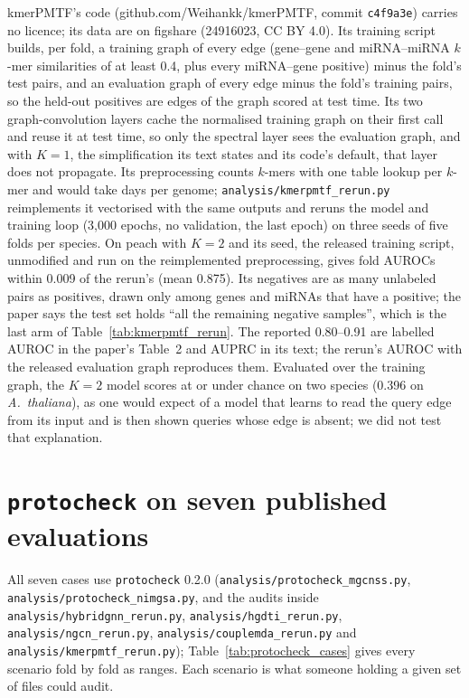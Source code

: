 \documentclass[review]{elsarticle}
\begin{document}
kmerPMTF's code (github.com/Weihankk/kmerPMTF, commit \texttt{c4f9a3e}) carries no licence; its data are on figshare
(24916023, CC BY 4.0). Its training script builds, per fold, a training graph of every edge (gene--gene and
miRNA--miRNA $k$-mer similarities of at least 0.4, plus every miRNA--gene positive) minus the fold's test pairs,
and an evaluation graph of every edge minus the fold's training pairs, so the held-out positives are edges of
the graph scored at test time. Its two graph-convolution layers cache the normalised training graph on their
first call and reuse it at test time, so only the spectral layer sees the evaluation graph, and with $K=1$,
the simplification its text states and its code's default, that layer does not propagate. Its preprocessing
counts $k$-mers with one table lookup per $k$-mer and would take days per genome;
\texttt{analysis/kmerpmtf\_rerun.py} reimplements it vectorised with the same outputs and reruns the model and
training loop (3,000 epochs, no validation, the last epoch) on three seeds of five folds per species. On peach
with $K=2$ and its seed, the released training script, unmodified and run on the reimplemented preprocessing,
gives fold AUROCs within 0.009 of the rerun's (mean 0.875). Its negatives are as many
unlabeled pairs as positives, drawn only among genes and miRNAs that have a positive; the paper says the test
set holds ``all the remaining negative samples'', which is the last arm of Table~\ref{tab:kmerpmtf_rerun}. The
reported 0.80--0.91 are labelled AUROC in the paper's Table~2 and AUPRC in its text; the rerun's AUROC with the
released evaluation graph reproduces them. Evaluated over the training graph, the $K=2$ model scores at or under
chance on two species (0.396 on \emph{A.\ thaliana}), as one would expect of a model that learns to read the
query edge from its input and is then shown queries whose edge is absent; we did not test that explanation.



\section{\texttt{protocheck} on seven published evaluations}
\label{app:protocheck_cases}
\setcounter{table}{0}
All seven cases use \texttt{protocheck} 0.2.0 (\texttt{analysis/protocheck\_mgcnss.py},
\texttt{analysis/protocheck\_nimgsa.py}, and the audits inside \texttt{analysis/hybridgnn\_rerun.py},
\texttt{analysis/hgdti\_rerun.py}, \texttt{analysis/ngcn\_rerun.py}, \texttt{analysis/couplemda\_rerun.py} and
\texttt{analysis/kmerpmtf\_rerun.py});
Table~\ref{tab:protocheck_cases} gives every scenario fold by fold as ranges. Each scenario is what someone holding a given set of files could audit.
\end{document}
